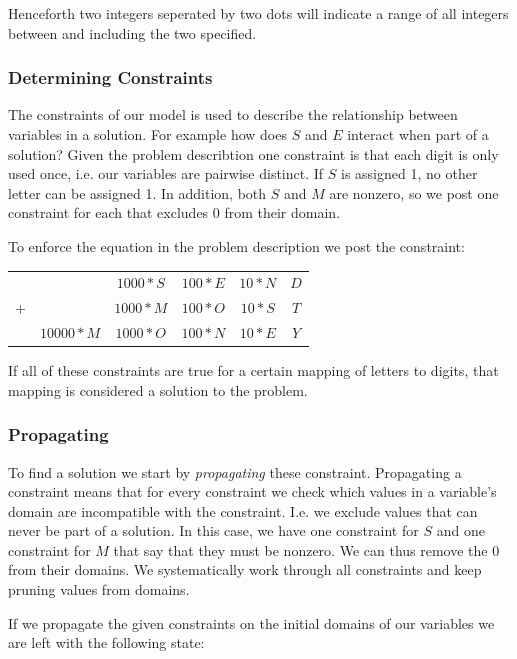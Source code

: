 Henceforth two integers seperated by two dots will indicate a range of all integers between
and including the two specified.

\subsubsection{Determining Constraints}

The constraints of our model is used to describe the relationship between variables in a
solution. For example how does $S$ and $E$ interact when part of a solution? Given the
problem describtion one constraint is that each digit is only used once, i.e. our variables
are pairwise distinct. If $S$ is assigned 1, no other letter can be assigned 1. In addition,
both $S$ and $M$ are nonzero, so we post one constraint for each that excludes 0 from their
domain.

To enforce the equation in the problem description we post the constraint: \\

\begin{tabular}{cccccc}
	& & $1000 * S$ & $100 * E$ & $10 * N$ & $D$ \\
	+ &	& $1000 * M$ & $100 * O$ & $10 * S$ & $T$ \\
	\hline
	& $10000 * M$ & $1000 * O$ & $100 * N$ & $10 * E$ & $Y$
\end{tabular}

If all of these constraints are true for a certain mapping of letters to digits, that
mapping is considered a solution to the problem.

\subsubsection{Propagating}

To find a solution we start by \textit{propagating} these constraint. Propagating a constraint
means that for every constraint we check which values in a variable's domain are incompatible
with the constraint. I.e. we exclude values that can never be part of a solution. In this
case, we have one constraint for $S$ and one constraint for $M$ that say that they must
be nonzero. We can thus remove the 0 from their domains. We systematically work through
all constraints and keep pruning values from domains.

If we propagate the given constraints on the initial domains of our variables we are left
with the following state:

